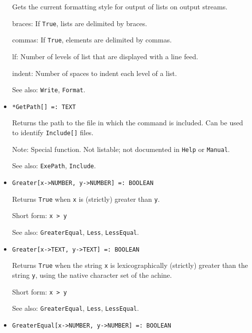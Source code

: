 \begin{itemize}
\bd
Gets the current formatting style for output of lists on output streams.
\bd
\item [braces:] If \verb+True+, lists are delimited by braces.
\item [commas:] If \verb+True+, elements are delimited by commas.
\item [lf:] Number of levels of list that are displayed with a line feed.
\item [indent:] Number of spaces to indent each level of a list.
\ed
\item [See also:] \verb+Write+, \verb+Format+.
\ed

\item{}
\protect \large \begin{verbatim}
*GetPath[] =: TEXT 
\end{verbatim} \normalsize

\bd
Returns the path to the file in which the command is included.  Can be
used to identify \verb+Include[]+ files. 
\item [Note:] Special function.  Not listable; not documented in
\verb+Help+ or \verb+Manual+.
\item [See also:] \verb+ExePath+, \verb+Include+.
\ed

\item{}
\protect \large \begin{verbatim}
Greater[x->NUMBER, y->NUMBER] =: BOOLEAN 
\end{verbatim}\normalsize

\bd
Returns \verb+True+ when \verb+x+ is (strictly) greater than \verb+y+.
\item
[Short form:] \verb+x > y+
\item
[See also:] \verb+GreaterEqual+, \verb+Less+, \verb+LessEqual+.
\ed

\item{}
\protect \large \begin{verbatim}
Greater[x->TEXT, y->TEXT] =: BOOLEAN 
\end{verbatim}\normalsize

\bd
Returns \verb+True+ when the string \verb+x+ is lexicographically (strictly)
greater than the string \verb+y+, using the native character set of the 
achine.
\item
[Short form:] \verb+x > y+
\item
[See also:] \verb+GreaterEqual+, \verb+Less+, \verb+LessEqual+.
\ed

\item{}
\protect \large \begin{verbatim}
GreaterEqual[x->NUMBER, y->NUMBER] =: BOOLEAN 
\end{verbatim}\normalsize


\end{itemize}
